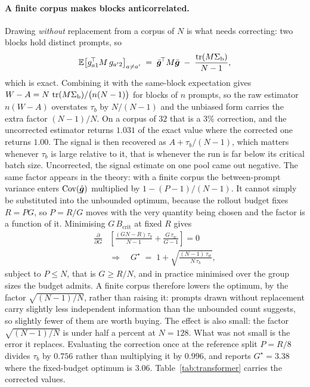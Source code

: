 \paragraph{A finite corpus makes blocks anticorrelated.} Drawing \emph{without} replacement from a
corpus of $N$ is what needs correcting: two blocks hold distinct prompts, so
\begin{equation}
  \label{eq:finite-corpus}
  \mathbb{E}\big[ g_{a1}^{\!\top} M\, g_{a'2} \big]_{a \neq a'}
  \;=\; \bar{\bm{g}}^{\!\top} M \bar{\bm{g}} \;-\; \frac{\operatorname{tr}(M\Sigma_{\mathrm{b}})}{N-1},
\end{equation}
which is exact. Combining it with the same-block expectation gives
$W - A = N\,\operatorname{tr}(M\Sigma_{\mathrm{b}}) / \big(n(N-1)\big)$ for blocks of $n$ prompts, so the raw estimator
$n(W-A)$ overstates $\tau_b$ by $N/(N-1)$ and the unbiased form carries the extra factor
$(N-1)/N$. On a corpus of $32$ that is a $3\%$ correction, and the uncorrected estimator returns
$1.031$ of the exact value where the corrected one returns $1.00$. The signal is then recovered as
$A + \tau_b/(N-1)$, which matters whenever $\tau_b$ is large relative to it, that is whenever the
run is far below its critical batch size. Uncorrected, the signal estimate on one pool came out
negative. The same factor appears in the theory: with a finite corpus the between-prompt
variance enters $\operatorname{Cov}(\hat{\bm{g}})$ multiplied by $1 - (P-1)/(N-1)$. It cannot simply be substituted
into the unbounded optimum, because the rollout budget fixes $R = PG$, so $P = R/G$ moves with
the very quantity being chosen and the factor is a function of it. Minimising $G\,B_{\text{crit}}$
at fixed $R$ gives
\begin{equation}
  \label{eq:gstar-corpus}
  \begin{aligned}
    \frac{\partial}{\partial G}
    &\left[
      \frac{(GN - R)\,\tau_b}{N-1} + \frac{G\,\tau_w}{G-1}
    \right] = 0 \\[2pt]
    &\Longrightarrow\quad
    G^{\star} \;=\; 1 + \sqrt{\frac{(N-1)\,\tau_w}{N\,\tau_b}},
  \end{aligned}
\end{equation}
subject to $P \le N$, that is $G \ge R/N$, and in practice minimised over the group sizes the
budget admits. A finite corpus therefore lowers the optimum, by the factor
$\sqrt{(N-1)/N}$, rather than raising it: prompts drawn without replacement carry slightly less
independent information than the unbounded count suggests, so slightly fewer of them are worth
buying. The effect is also small: the factor $\sqrt{(N-1)/N}$ is under half a percent at
$N = 128$. What was not small is the error it replaces. Evaluating the correction once at the
reference split $P = R/8$ divides $\tau_b$ by $0.756$ rather than multiplying it by $0.996$, and
reports $G^{\star} = 3.38$ where the fixed-budget optimum is $3.06$. Table~\ref{tab:transformer}
carries the corrected values.


